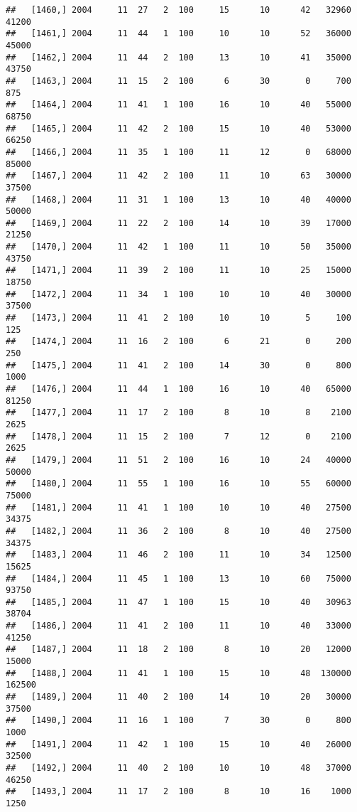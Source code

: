 \documentclass{article}\usepackage[]{graphicx}\usepackage[]{color}
\makeatletter
\newenvironment{kframe}{%
 \def\at@end@of@kframe{}%
 \ifinner\ifhmode%
  \def\at@end@of@kframe{\end{minipage}}%
  \begin{minipage}{\columnwidth}%
 \fi\fi%
 \def\FrameCommand##1{\hskip\@totalleftmargin \hskip-\fboxsep
 \colorbox{shadecolor}{##1}\hskip-\fboxsep
     \hskip-\linewidth \hskip-\@totalleftmargin \hskip\columnwidth}%
 \MakeFramed {\advance\hsize-\width
   \@totalleftmargin\z@ \linewidth\hsize
   \@setminipage}}%
 {\par\unskip\endMakeFramed%
 \at@end@of@kframe}
\newenvironment{knitrout}{}{} %
\makeatother
\begin{document}
\begin{knitrout}
\begin{kframe}
\begin{verbatim}
##   [1460,] 2004     11  27   2  100     15      10      42   32960   41200
##   [1461,] 2004     11  44   1  100     10      10      52   36000   45000
##   [1462,] 2004     11  44   2  100     13      10      41   35000   43750
##   [1463,] 2004     11  15   2  100      6      30       0     700     875
##   [1464,] 2004     11  41   1  100     16      10      40   55000   68750
##   [1465,] 2004     11  42   2  100     15      10      40   53000   66250
##   [1466,] 2004     11  35   1  100     11      12       0   68000   85000
##   [1467,] 2004     11  42   2  100     11      10      63   30000   37500
##   [1468,] 2004     11  31   1  100     13      10      40   40000   50000
##   [1469,] 2004     11  22   2  100     14      10      39   17000   21250
##   [1470,] 2004     11  42   1  100     11      10      50   35000   43750
##   [1471,] 2004     11  39   2  100     11      10      25   15000   18750
##   [1472,] 2004     11  34   1  100     10      10      40   30000   37500
##   [1473,] 2004     11  41   2  100     10      10       5     100     125
##   [1474,] 2004     11  16   2  100      6      21       0     200     250
##   [1475,] 2004     11  41   2  100     14      30       0     800    1000
##   [1476,] 2004     11  44   1  100     16      10      40   65000   81250
##   [1477,] 2004     11  17   2  100      8      10       8    2100    2625
##   [1478,] 2004     11  15   2  100      7      12       0    2100    2625
##   [1479,] 2004     11  51   2  100     16      10      24   40000   50000
##   [1480,] 2004     11  55   1  100     16      10      55   60000   75000
##   [1481,] 2004     11  41   1  100     10      10      40   27500   34375
##   [1482,] 2004     11  36   2  100      8      10      40   27500   34375
##   [1483,] 2004     11  46   2  100     11      10      34   12500   15625
##   [1484,] 2004     11  45   1  100     13      10      60   75000   93750
##   [1485,] 2004     11  47   1  100     15      10      40   30963   38704
##   [1486,] 2004     11  41   2  100     11      10      40   33000   41250
##   [1487,] 2004     11  18   2  100      8      10      20   12000   15000
##   [1488,] 2004     11  41   1  100     15      10      48  130000  162500
##   [1489,] 2004     11  40   2  100     14      10      20   30000   37500
##   [1490,] 2004     11  16   1  100      7      30       0     800    1000
##   [1491,] 2004     11  42   1  100     15      10      40   26000   32500
##   [1492,] 2004     11  40   2  100     10      10      48   37000   46250
##   [1493,] 2004     11  17   2  100      8      10      16    1000    1250

\end{verbatim}
\end{kframe}
\end{knitrout}
\end{document}
